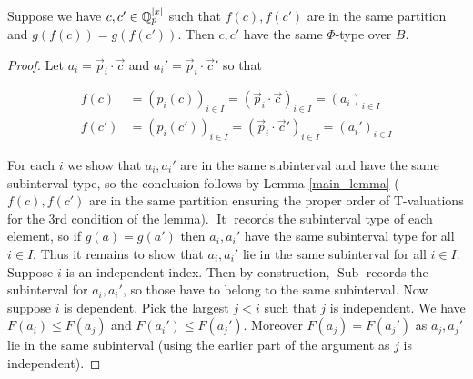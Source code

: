 \documentclass{amsart}
\DeclareMathOperator{\It}{It}
\DeclareMathOperator{\Sub}{Sub}
\begin{document}
\begin{Lemma}
  Suppose we have $c, c' \in \mathbb{Q}_p^{|x|}$ such that $f(c), f(c')$ are in the same partition and $g(f(c)) = g(f(c'))$.
  Then $c, c'$ have the same $\Phi$-type over $B$.
\end{Lemma}

\begin{proof}
  Let $a_i = \vec p_i \cdot \vec c$ and $a_i' = \vec p_i \cdot \vec c'$ so that

  \begin{align*}
    f(c) &= (p_i(c))_{i \in I} = (\vec p_i \cdot \vec c)_{i \in I} = (a_i)_{i \in I} \\
    f(c') &= (p_i(c'))_{i \in I} = (\vec p_i \cdot \vec c')_{i \in I} = (a_i')_{i \in I}
  \end{align*}

  For each $i$ we show that $a_i, a_i'$ are in the same subinterval and have the same subinterval type, so the conclusion follows by Lemma \ref{main_lemma}
  ($f(c), f(c')$ are in the same partition ensuring the proper order of T-valuations for the 3rd condition of the lemma).
  $\It$ records the subinterval type of each element, so if $g(\bar a) = g(\bar a')$ then $a_i, a_i'$ have the same subinterval type for all $i \in I$.
  Thus it remains to show that $a_i, a_i'$ lie in the same subinterval for all $i \in I$.
  Suppose $i$ is an independent index.
  Then by construction, $\Sub$ records the subinterval for $a_i, a_i'$, so those have to belong to the same subinterval.
  Now suppose $i$ is dependent.
  Pick the largest $j < i$ such that $j$ is independent.
  We have $F(a_i) \leq F(a_j)$ and $F(a_i') \leq F(a_j')$.
  Moreover $F(a_j) = F(a_j')$ as $a_j, a_j'$ lie in the same subinterval (using the earlier part of the argument as $j$ is independent).
  

\end{proof}
\end{document}
